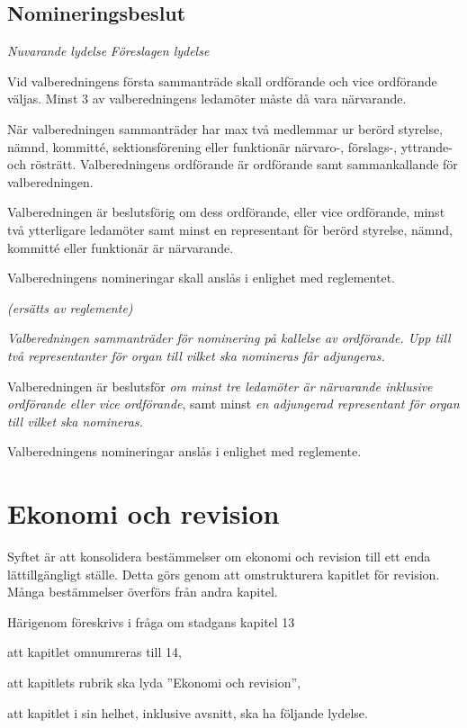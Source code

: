 \documentclass{article}
\newenvironment{lydelse}
    {\begin{paracol}{2}%
        \emph{Nuvarande lydelse}%
        \switchcolumn%
        \emph{Föreslagen lydelse}%
    \end{paracol}%
    \begin{enumerate}[label=\thesubsection.\arabic*]%
    \begin{paracol}{2}%
    }{\end{paracol}\end{enumerate}}
\begin{document}
\subsection{Nomineringsbeslut}
\begin{lydelse}
  \setcounter{section}{6}
  \setcounter{subsection}{3}
  \item Vid valberedningens första sammanträde skall ordförande och vice ordförande väljas. Minst 3 av valberedningens ledamöter måste då vara närvarande.
  \item När valberedningen sammanträder har max två medlemmar ur berörd styrelse, nämnd, kommitté, sektions\-förening eller funktionär närvaro-, för\-slags-, yttrande- och rösträtt. Valberedningens ordförande är ordförande samt sammankallande för valberedningen.
  \item Valberedningen är beslutsförig om dess ordförande, eller vice ordförande, minst två ytterligare
ledamöter samt minst en representant för berörd styrelse, nämnd, kommitté eller funktionär
är närvarande.
  \setcounter{subsection}{5}
  \setcounter{enumi}{0}
  \item Valberedningens nomineringar skall anslås i enlighet med reglementet.
  \switchcolumn
  \item[] \emph{(ersätts av reglemente)}
  \item \emph{Valberedningen sammanträder för nominering på kallelse av ordförande. Upp till två representanter för organ till vilket ska nomineras får adjungeras.}
  \item Valberedningen är beslutsför \emph{om minst tre ledamöter är närvarande inklusive ordförande eller vice ordförande}, samt minst \emph{en adjungerad representant för organ till vilket ska nomineras.}
  \item Valberedningens nomineringar anslås i enlighet med reglemente.
\end{lydelse}
\setcounter{section}{13}
\setcounter{subsection}{1}

\section{Ekonomi och revision}
Syftet är att konsolidera bestämmelser om ekonomi och revision till ett enda lättillgängligt ställe.
Detta görs genom att omstrukturera kapitlet för revision.
Många bestämmelser överförs från andra kapitel.

Härigenom föreskrivs i fråga om stadgans kapitel 13
\begin{dels}
  \item att kapitlet omnumreras till 14,
  \item att kapitlets rubrik ska lyda ''Ekonomi och revision'',
  \item att kapitlet i sin helhet, inklusive avsnitt, ska ha följande lydelse.
\end{dels}
\end{document}
